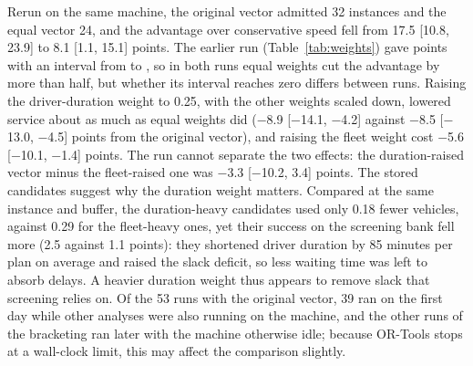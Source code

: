 Rerun on the same machine, the original vector admitted 32 instances and the equal vector 24, and the advantage over conservative speed fell from 17.5 [10.8, 23.9] to 8.1 [1.1, 15.1] points. The earlier run (Table~\ref{tab:weights}) gave \WtEqualPCMean{} points with an interval from \WtEqualPCLo{} to \WtEqualPCHi{}, so in both runs equal weights cut the advantage by more than half, but whether its interval reaches zero differs between runs. Raising the driver-duration weight to 0.25, with the other weights scaled down, lowered service about as much as equal weights did ($-$8.9 [$-$14.1, $-$4.2] against $-$8.5 [$-$13.0, $-$4.5] points from the original vector), and raising the fleet weight cost $-$5.6 [$-$10.1, $-$1.4] points. The run cannot separate the two effects: the duration-raised vector minus the fleet-raised one was $-$3.3 [$-$10.2, 3.4] points. The stored candidates suggest why the duration weight matters. Compared at the same instance and buffer, the duration-heavy candidates used only 0.18 fewer vehicles, against 0.29 for the fleet-heavy ones, yet their success on the screening bank fell more (2.5 against 1.1 points): they shortened driver duration by 85 minutes per plan on average and raised the slack deficit, so less waiting time was left to absorb delays. A heavier duration weight thus appears to remove slack that screening relies on. Of the 53 runs with the original vector, 39 ran on the first day while other analyses were also running on the machine, and the other runs of the bracketing ran later with the machine otherwise idle; because OR-Tools stops at a wall-clock limit, this may affect the comparison slightly.
